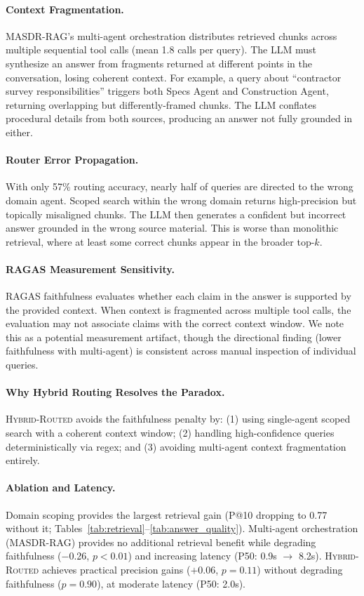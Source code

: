 \documentclass{article}
\newcommand{\systemname}{\textsc{MASDR-RAG}}
\newcommand{\hybridname}{\textsc{Hybrid-Routed}}
\begin{document}
\paragraph{Context Fragmentation.} \systemname{}'s multi-agent orchestration distributes retrieved chunks across multiple sequential tool calls (mean 1.8 calls per query). The LLM must synthesize an answer from fragments returned at different points in the conversation, losing coherent context. For example, a query about ``contractor survey responsibilities'' triggers both Specs Agent and Construction Agent, returning overlapping but differently-framed chunks. The LLM conflates procedural details from both sources, producing an answer not fully grounded in either.

\paragraph{Router Error Propagation.} With only 57\% routing accuracy, nearly half of queries are directed to the wrong domain agent. Scoped search within the wrong domain returns high-precision but topically misaligned chunks. The LLM then generates a confident but incorrect answer grounded in the wrong source material. This is worse than monolithic retrieval, where at least some correct chunks appear in the broader top-$k$.

\paragraph{RAGAS Measurement Sensitivity.} RAGAS faithfulness evaluates whether each claim in the answer is supported by the provided context. When context is fragmented across multiple tool calls, the evaluation may not associate claims with the correct context window. We note this as a potential measurement artifact, though the directional finding (lower faithfulness with multi-agent) is consistent across manual inspection of individual queries.

\paragraph{Why Hybrid Routing Resolves the Paradox.} \hybridname{} avoids the faithfulness penalty by: (1) using single-agent scoped search with a coherent context window; (2) handling high-confidence queries deterministically via regex; and (3) avoiding multi-agent context fragmentation entirely.

\paragraph{Ablation and Latency.} Domain scoping provides the largest retrieval gain (P@10 dropping to 0.77 without it; Tables~\ref{tab:retrieval}--\ref{tab:answer_quality}). Multi-agent orchestration (\systemname{}) provides no additional retrieval benefit while degrading faithfulness ($-$0.26, $p < 0.01$) and increasing latency (P50: 0.9s $\rightarrow$ 8.2s). \hybridname{} achieves practical precision gains ($+$0.06, $p = 0.11$) without degrading faithfulness ($p = 0.90$), at moderate latency (P50: 2.0s).
\end{document}
